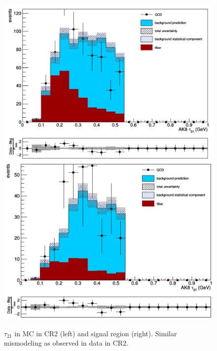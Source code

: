 \begin{figure}[thb!]
\begin{center}
\includegraphics[scale=0.35]{Figures/tau21MCCR2.pdf}
\includegraphics[scale=0.35]{Figures/tau21MCSR.pdf}
\end{center}
\caption{$\tau_{21}$ in MC in CR2 (left) and signal region (right). Similar mismodeling as observed in data in CR2.}
\label{fig:CR2tauMC}
\end{figure}


